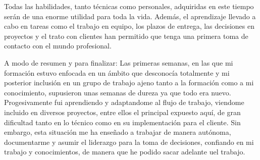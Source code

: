 Todas las habilidades, tanto técnicas como personales, adquiridas en este tiempo serán de una enorme utilidad para toda la vida. Además, el aprendizaje llevado a cabo en tareas como el trabajo en equipo, los plazos de entrega, las decisiones en proyectos y el trato con clientes han permitido que tenga una primera toma de contacto con el mundo profesional.

A modo de resumen y para finalizar: Las primeras semanas, en las que mi formación estuvo enfocada en un ámbito que desconocía totalmente y mi posterior inclusión en un grupo de trabajo ajeno tanto a la formación como a mi conocimiento, supusieron unas semanas de dureza ya que todo era nuevo. Progesivamente fui aprendiendo y adaptandome al flujo de trabajo, viendome incluido en diversos proyectos, entre ellos el principal expuesto aquí, de gran dificultad tanto en lo técnico como en su implementación para el cliente. Sin embargo, esta situación me ha enseñado a trabajar de manera autónoma, documentarme y asumir el liderazgo para la toma de decisiones, confiando en mi trabajo y conocimientos, de manera que he podido sacar adelante uel trabajo.
%
%
%